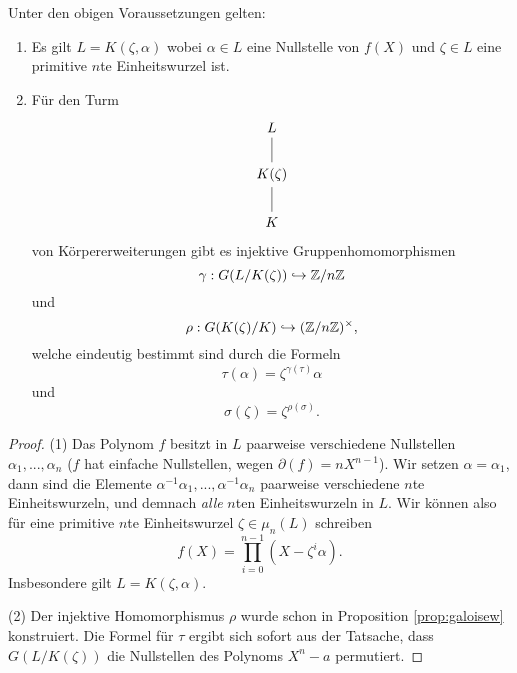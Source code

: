 \documentclass{book}
\begin{document}
\begin{prop}
    \label{prop:radgalois} Unter den obigen Voraussetzungen gelten:
    \begin{enumerate}
        \item Es gilt $L = K(\zeta, \alpha)$ wobei $\alpha \in L$ eine
            Nullstelle von $f(X)$ und $\zeta \in L$ eine primitive $n$te
            Einheitswurzel ist. 
        \item Für den Turm
            \[
            \begin{tikzcd}
                L \ar[dash]{d} \\
                K(\zeta)\ar[dash]{d}\\
                K
            \end{tikzcd}
            \]
            von Körpererweiterungen gibt es injektive Gruppenhomomorphismen
            \[
                \gamma: G(L/K(\zeta)) \hookrightarrow \mathbb{Z}/n\mathbb{Z}
            \]
            und
            \[
                \rho: G(K(\zeta)/K) \hookrightarrow (\mathbb{Z}/n\mathbb{Z})^{\times},
            \]
            welche eindeutig bestimmt sind durch die Formeln
            \[
                \tau(\alpha) = \zeta^{\gamma(\tau)} \alpha
            \]
            und
            \[
                \sigma(\zeta) = \zeta^{\rho(\sigma)}.
            \]
    \end{enumerate}
\end{prop}
\begin{proof}
    (1) Das Polynom $f$ besitzt in $L$ paarweise verschiedene Nullstellen
    $\alpha_1, ..., \alpha_n$ ($f$ hat einfache Nullstellen, wegen $\partial(f)
    = n X^{n-1}$). Wir setzen $\alpha = \alpha_1$, dann sind die Elemente
    $\alpha^{-1} \alpha_1, ..., \alpha^{-1} \alpha_n$ paarweise verschiedene
    $n$te Einheitswurzeln, und demnach {\em alle} $n$ten Einheitswurzeln in
    $L$. Wir können also für eine primitive $n$te Einheitswurzel $\zeta \in
    \mu_n(L)$ schreiben
    \[
        f(X) = \prod_{i = 0}^{n-1} (X - \zeta^i \alpha).
    \]
    Insbesondere gilt $L = K(\zeta,\alpha)$. 

    (2) Der injektive Homomorphismus $\rho$ wurde schon in Proposition
    \ref{prop:galoisew} konstruiert. Die Formel für $\tau$ ergibt sich sofort
    aus der Tatsache, dass $G(L/K(\zeta))$ die Nullstellen des Polynoms $X^n -
    a$ permutiert. 
\end{proof}
\end{document}
